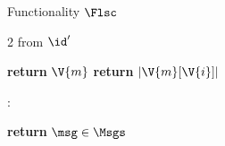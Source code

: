 \begin{interface}[nofloat]{Functionality $\Flsc$ \\
}
{\begin{multicols}{2}
 \quad from $\id'$
\begin{algorithmic}[1]
\algcont
{} \label{ln:lscall}
  \State \textbf{return} $\V{m}$ \label{ln:lscdisclose}
\EndIf
\State \textbf{return} $|\V{m}[\V{i}]|$ \label{ln:lsclen}
\algsave
\end{algorithmic}
\vspace{1.4ex}

\opsig{$\Clean_{\msg}(\msg)$}:
\begin{algorithmic}[1]
\algcont
\State \textbf{return} $\msg \in \Msgs$
\algsave
\end{algorithmic}
\end{multicols}}
\end{interface}

